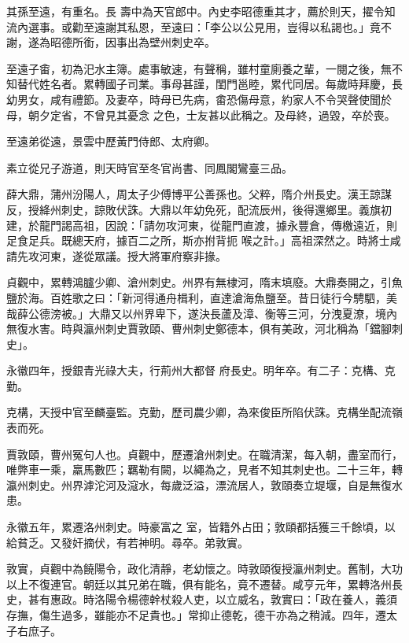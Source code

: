 \begin{pinyinscope}
 其孫至遠，有重名。長
 壽中為天官郎中。內史李昭德重其才，薦於則天，擢令知流內選事。或勸至遠謝其私恩，至遠曰：「李公以公見用，豈得以私謁也。」竟不謝，遂為昭德所銜，因事出為壁州刺史卒。



 至遠子畬，初為汜水主簿。處事敏速，有聲稱，雖村童廁養之輩，一閱之後，無不知替代姓名者。累轉國子司業。事母甚謹，閨門邕睦，累代同居。每歲時拜慶，長幼男女，咸有禮節。及妻卒，時母已先病，畬恐傷母意，約家人不令哭聲使聞於母，朝夕定省，不曾見其憂念
 之色，士友甚以此稱之。及母終，過毀，卒於喪。



 至遠弟從遠，景雲中歷黃門侍郎、太府卿。



 素立從兄子游道，則天時官至冬官尚書、同鳳閣鸞臺三品。



 薛大鼎，蒲州汾陽人，周太子少傅博平公善孫也。父粹，隋介州長史。漢王諒謀反，授絳州刺史，諒敗伏誅。大鼎以年幼免死，配流辰州，後得還鄉里。義旗初建，於龍門謁高祖，因說：「請勿攻河東，從龍門直渡，據永豐倉，傳檄遠近，則足食足兵。既總天府，據百二之所，斯亦拊背扼
 喉之計。」高祖深然之。時將士咸請先攻河東，遂從眾議。授大將軍府察非掾。



 貞觀中，累轉鴻臚少卿、滄州刺史。州界有無棣河，隋末填廢。大鼎奏開之，引魚鹽於海。百姓歌之曰：「新河得通舟楫利，直達滄海魚鹽至。昔日徒行今騁駟，美哉薛公德滂被。」大鼎又以州界卑下，遂決長蘆及漳、衡等三河，分洩夏潦，境內無復水害。時與瀛州刺史賈敦頤、曹州刺史鄭德本，俱有美政，河北稱為「鐺腳刺史」。



 永徽四年，授銀青光祿大夫，行荊州大都督
 府長史。明年卒。有二子：克構、克勤。



 克構，天授中官至麟臺監。克勤，歷司農少卿，為來俊臣所陷伏誅。克構坐配流嶺表而死。



 賈敦頤，曹州冤句人也。貞觀中，歷遷滄州刺史。在職清潔，每入朝，盡室而行，唯弊車一乘，羸馬數匹；羈勒有闕，以繩為之，見者不知其刺史也。二十三年，轉瀛州刺史。州界滹沱河及滱水，每歲泛溢，漂流居人，敦頤奏立堤堰，自是無復水患。



 永徽五年，累遷洛州刺史。時豪富之
 室，皆籍外占田；敦頤都括獲三千餘頃，以給貧乏。又發奸摘伏，有若神明。尋卒。弟敦實。



 敦實，貞觀中為饒陽令，政化清靜，老幼懷之。時敦頤復授瀛州刺史。舊制，大功以上不復連官。朝廷以其兄弟在職，俱有能名，竟不遷替。咸亨元年，累轉洛州長史，甚有惠政。時洛陽令楊德幹杖殺人吏，以立威名，敦實曰：「政在養人，義須存撫，傷生過多，雖能亦不足貴也。」常抑止德乾，德干亦為之稍減。四年，遷太子右庶子。




\end{pinyinscope}
